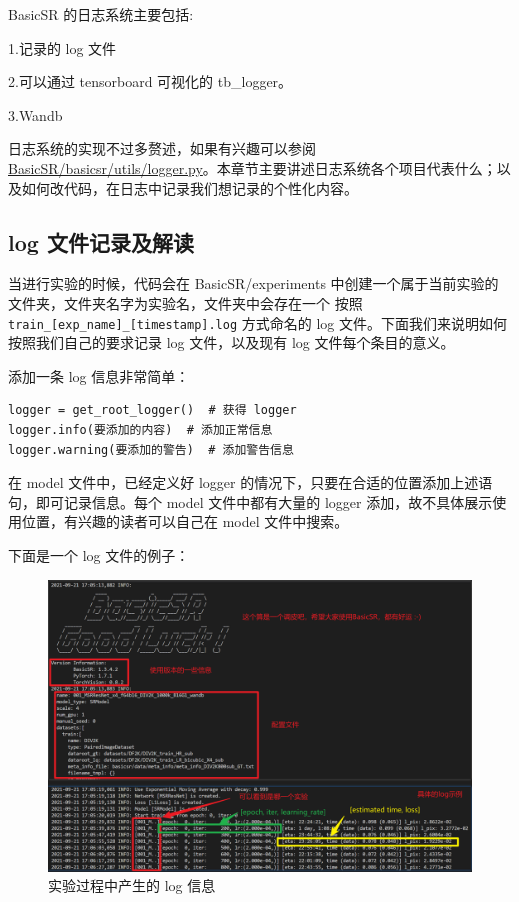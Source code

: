 \documentclass[../main.tex]{subfiles}
\begin{document}
BasicSR 的日志系统主要包括:

1.记录的 log 文件

2.可以通过 tensorboard 可视化的 tb\_logger。

3.Wandb

日志系统的实现不过多赘述，如果有兴趣可以参阅 \href{https://github.com/XPixelGroup/BasicSR/blob/master/basicsr/utils/logger.py}{BasicSR/basicsr/utils/logger.py}。本章节主要讲述日志系统各个项目代表什么；以及如何改代码，在日志中记录我们想记录的个性化内容。

\subsection{log 文件记录及解读}

当进行实验的时候，代码会在 BasicSR/experiments 中创建一个属于当前实验的文件夹，文件夹名字为实验名，文件夹中会存在一个 按照 \texttt{train\_[exp\_name]\_[timestamp].log} 方式命名的 log 文件。下面我们来说明如何按照我们自己的要求记录 log 文件，以及现有 log 文件每个条目的意义。

\begin{hl} %

    添加一条 log 信息非常简单：

\begin{verbatim}
logger = get_root_logger()  # 获得 logger
logger.info(要添加的内容)  # 添加正常信息
logger.warning(要添加的警告)  # 添加警告信息
\end{verbatim}
\end{hl}

在 model 文件中，已经定义好 logger 的情况下，只要在合适的位置添加上述语句，即可记录信息。每个 model 文件中都有大量的 logger 添加，故不具体展示使用位置，有兴趣的读者可以自己在 model 文件中搜索。


下面是一个 log 文件的例子：

\begin{figure}[H]
    \begin{center}
        \includegraphics[width=0.7\linewidth]{figures/getting_start_6.png}
        \caption{实验过程中产生的 log 信息}
        \label{fig:getting_start_6}
    \end{center}
    \vspace{-0.5cm}
\end{figure}
\end{document}
